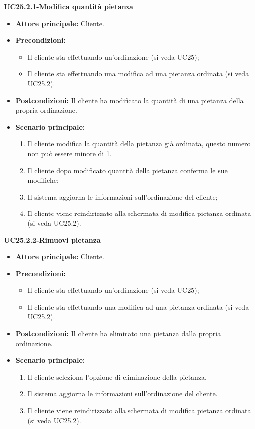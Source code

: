 \textbf{UC25.2.1-Modifica quantità pietanza}
\begin{itemize}
\item \textbf{Attore principale:} Cliente.
\item \textbf{Precondizioni:} 
\begin{itemize}
    \item Il cliente sta effettuando un'ordinazione (si veda UC25);
    \item Il cliente sta effettuando una modifica ad una pietanza ordinata (si veda UC25.2).
\end{itemize}
\item \textbf{Postcondizioni:} Il cliente ha modificato la quantità di una pietanza della propria ordinazione.
\item \textbf{Scenario principale:}
\begin{enumerate}
    \item Il cliente modifica la quantità della pietanza già ordinata, questo numero non può essere minore di 1.
    \item Il cliente dopo modificato quantità della pietanza conferma le sue modifiche;
    \item Il sistema aggiorna le informazioni sull'ordinazione del cliente;
    \item Il cliente viene reindirizzato alla schermata di modifica pietanza ordinata (si veda UC25.2).
\end{enumerate}
\end{itemize}

\textbf{UC25.2.2-Rimuovi pietanza}
\begin{itemize}
\item \textbf{Attore principale:} Cliente.
\item \textbf{Precondizioni:} 
\begin{itemize}
    \item Il cliente sta effettuando un'ordinazione (si veda UC25);
    \item Il cliente sta effettuando una modifica ad una pietanza ordinata (si veda UC25.2).
\end{itemize}
\item \textbf{Postcondizioni:} Il cliente ha eliminato una pietanza dalla propria ordinazione.
\item \textbf{Scenario principale:}
\begin{enumerate}
    \item Il cliente seleziona l'opzione di eliminazione della pietanza.
    \item Il sistema aggiorna le informazioni sull'ordinazione del cliente.
    \item Il cliente viene reindirizzato alla schermata di modifica pietanza ordinata (si veda UC25.2).
\end{enumerate}
\end{itemize}

